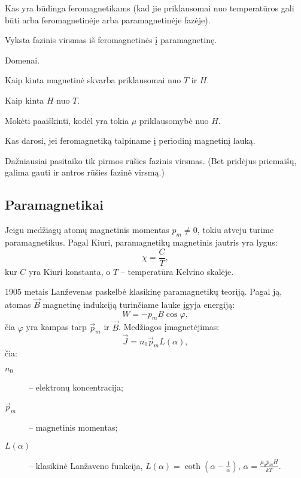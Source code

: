 \begin{remember}
  \item Kas yra būdinga feromagnetikams (kad jie priklausomai nuo
    temperatūros gali būti arba feromagnetinėje arba paramagnetinėje
    fazėje).
  \item Vyksta fazinis virsmas iš feromagnetinės į paramagnetinę.
  \item Domenai.
  \item Kaip kinta magnetinė skvarba priklausomai nuo $T$ ir $H$.
  \item Kaip kinta $H$ nuo $T$.
  \item Mokėti paaiškinti, kodėl yra tokia $\mu$ priklausomybė nuo $H$.
  \item Kas darosi, jei feromagnetiką talpiname į periodinį magnetinį
    lauką.
\end{remember}

\begin{note}
  Dažniausiai pasitaiko tik pirmos rūšies fazinis virsmas. (Bet pridėjus
  priemaišų, galima gauti ir antros rūšies fazinė virsmą.)
\end{note}

\subsection{Paramagnetikai}

Jeigu medžiagų atomų magnetinis momentas $p_{m} \neq 0$, tokiu atveju
turime paramagnetikus. Pagal Kiuri, paramagnetikų magnetinis jautris
yra lygus:
\begin{equation*}
  \chi = \frac{C}{T},
\end{equation*}
kur $C$ yra Kiuri konstanta, o $T$ – temperatūra Kelvino skalėje.

1905 metais Lanževenas paskelbė klasikinę paramagnetikų teoriją.
Pagal ją, atomas $\vec{B}$ magnetinę indukciją turinčiame lauke
įgyja energiją:
\begin{equation*}
  W = -p_{m}B\cos \varphi,
\end{equation*}
čia $\varphi$ yra kampas tarp $\vec{p}_{m}$ ir $\vec{B}$.
Medžiagos įmagnetėjimas:
\begin{equation*}
  \vec{J} = n_{0}\vec{p}_{m}L(\alpha),
\end{equation*}
čia:
\begin{description}
  \item[$n_{0}$] – elektronų koncentracija;
  \item[$\vec{p}_{m}$] – magnetinis momentas;
  \item[$L(\alpha)$] – klasikinė Lanžaveno funkcija,
    $L(\alpha) = \coth\left( \alpha - \frac{1}{\alpha} \right)$,
    $\alpha = \frac{\mu_{0}p_{m}H}{kT}$.
\end{description}

